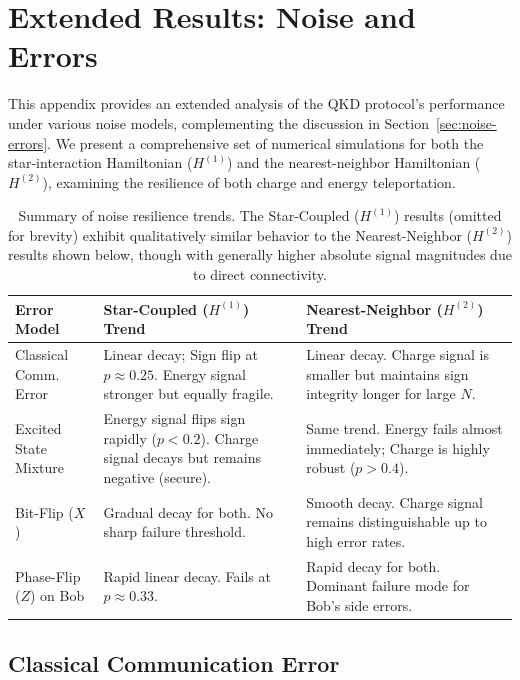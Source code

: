 \section{Extended Results: Noise and Errors}
\label{appendix:noise-errors}

This appendix provides an extended analysis of the QKD protocol's performance under various noise models, complementing the discussion in Section~\ref{sec:noise-errors}. We present a comprehensive set of numerical simulations for both the star-interaction Hamiltonian ($H^{(1)}$) and the nearest-neighbor Hamiltonian ($H^{(2)}$), examining the resilience of both charge and energy teleportation.

\begin{table}[ht!]
\centering
\begin{tabular}{|l|p{6cm}|p{6cm}|}
\hline
\textbf{Error Model} & \textbf{Star-Coupled ($H^{(1)}$) Trend} & \textbf{Nearest-Neighbor ($H^{(2)}$) Trend} \\ \hline
Classical Comm. Error & Linear decay; Sign flip at $p \approx 0.25$. Energy signal stronger but equally fragile. & Linear decay. Charge signal is smaller but maintains sign integrity longer for large $N$. \\ \hline
Excited State Mixture & Energy signal flips sign rapidly ($p < 0.2$). Charge signal decays but remains negative (secure). & Same trend. Energy fails almost immediately; Charge is highly robust ($p > 0.4$). \\ \hline
Bit-Flip ($X$) & Gradual decay for both. No sharp failure threshold. & Smooth decay. Charge signal remains distinguishable up to high error rates. \\ \hline
Phase-Flip ($Z$) on Bob & Rapid linear decay. Fails at $p \approx 0.33$. & Rapid decay for both. Dominant failure mode for Bob's side errors. \\ \hline
\end{tabular}
\caption{Summary of noise resilience trends. The Star-Coupled ($H^{(1)}$) results (omitted for brevity) exhibit qualitatively similar behavior to the Nearest-Neighbor ($H^{(2)}$) results shown below, though with generally higher absolute signal magnitudes due to direct connectivity.}
\label{tab:noise_summary}
\end{table}

\subsection{Classical Communication Error}

